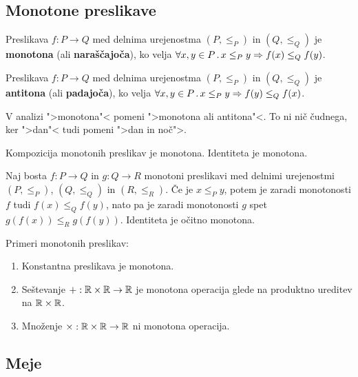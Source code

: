 \subsection{Monotone preslikave}

\begin{definicija}
  Preslikava $f : P \to Q$ med delnima urejenostma $(P, {\leq_P})$ in $(Q, {\leq_Q})$ je
  \textbf{monotona} (ali \textbf{naraščajoča}), ko velja $\forall x, y \in P \,.\, x \leq_P y \Rightarrow f(x) \leq_Q f(y)$.
\end{definicija}

\begin{definicija}
  Preslikava $f : P \to Q$ med delnima urejenostma $(P, \leq_P)$ in $(Q, \leq_Q)$ je
  \textbf{antitona} (ali \textbf{padajoča}), ko velja $\forall x, y \in P \,.\, x \leq_P y \Rightarrow f(y) \leq_Q f(x)$.
\end{definicija}

\begin{opomba}
  V analizi ">monotona"< pomeni ">monotona ali antitona"<. To ni nič
  čudnega, ker ">dan"< tudi pomeni ">dan in noč">.
\end{opomba}

\begin{izrek}
  Kompozicija monotonih preslikav je monotona. Identiteta je monotona.
\end{izrek}

\begin{dokaz}
  Naj bosta $f : P \to Q$ in $g : Q \to R$ monotoni preslikavi med delnimi
  urejenostmi $(P, {\leq_P})$, $(Q, {\leq_Q})$ in $(R, {\leq_R})$. Če je $x \leq_P y$, potem je zaradi monotonosti $f$ tudi $f(x) \leq_Q f(y)$, nato pa je zaradi monotonosti $g$ spet $g(f(x)) \leq_R g(f(y))$. Identiteta je očitno monotona.
\end{dokaz}

\begin{primer}
  Primeri monotonih preslikav:
  \begin{enumerate}
    \item Konstantna preslikava je monotona.
    \item Seštevanje ${+} : \mathbb{R} \times \mathbb{R} \to \mathbb{R}$ je monotona operacija glede na produktno ureditev na $\mathbb{R} \times \mathbb{R}$.
    \item Množenje ${\times} : \mathbb{R} \times \mathbb{R} \to \mathbb{R}$ ni monotona operacija.
  \end{enumerate}
\end{primer}


\subsection{Meje}

